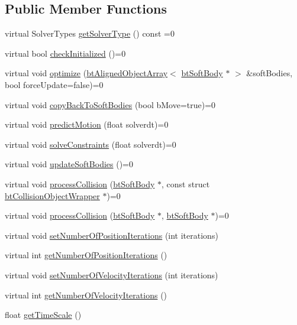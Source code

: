 \subsection*{Public Member Functions}
\begin{DoxyCompactItemize}
\item 
virtual Solver\+Types \hyperlink{classbt_soft_body_solver_aa08308ddb8e4661ab3c3e23cf3da647c}{get\+Solver\+Type} () const =0
\item 
virtual bool \hyperlink{classbt_soft_body_solver_aae0adf7ffc11cd7fafec927a54c654d5}{check\+Initialized} ()=0
\item 
virtual void \hyperlink{classbt_soft_body_solver_af07da1ec6f11e7873bc5fafef426fcd3}{optimize} (\hyperlink{classbt_aligned_object_array}{bt\+Aligned\+Object\+Array}$<$ \hyperlink{classbt_soft_body}{bt\+Soft\+Body} $\ast$ $>$ \&soft\+Bodies, bool force\+Update=false)=0
\item 
virtual void \hyperlink{classbt_soft_body_solver_ac4034ba178cb75bd880a44958eaa38d1}{copy\+Back\+To\+Soft\+Bodies} (bool b\+Move=true)=0
\item 
virtual void \hyperlink{classbt_soft_body_solver_a72f0c095ae30002a6f98fc194a63e1ba}{predict\+Motion} (float solverdt)=0
\item 
virtual void \hyperlink{classbt_soft_body_solver_a5e71a2a32786574bedf409ba822980eb}{solve\+Constraints} (float solverdt)=0
\item 
virtual void \hyperlink{classbt_soft_body_solver_adac4b4f20eee46dc4fab26ed25be89ef}{update\+Soft\+Bodies} ()=0
\item 
virtual void \hyperlink{classbt_soft_body_solver_a7dea7c2ce8ad4e8cae29219ffeebe18d}{process\+Collision} (\hyperlink{classbt_soft_body}{bt\+Soft\+Body} $\ast$, const struct \hyperlink{structbt_collision_object_wrapper}{bt\+Collision\+Object\+Wrapper} $\ast$)=0
\item 
virtual void \hyperlink{classbt_soft_body_solver_a08f03a574f0936d834ff100f87755ea6}{process\+Collision} (\hyperlink{classbt_soft_body}{bt\+Soft\+Body} $\ast$, \hyperlink{classbt_soft_body}{bt\+Soft\+Body} $\ast$)=0
\item 
virtual void \hyperlink{classbt_soft_body_solver_a80ffccfd244c51b2843991989a4191c9}{set\+Number\+Of\+Position\+Iterations} (int iterations)
\item 
virtual int \hyperlink{classbt_soft_body_solver_a814e9da6744f13f47613903e6fee5587}{get\+Number\+Of\+Position\+Iterations} ()
\item 
virtual void \hyperlink{classbt_soft_body_solver_a48b281048407640c73bfd355125a55e5}{set\+Number\+Of\+Velocity\+Iterations} (int iterations)
\item 
virtual int \hyperlink{classbt_soft_body_solver_a19a6754913540e92a387ffa5dbb2d29c}{get\+Number\+Of\+Velocity\+Iterations} ()
\item 
float \hyperlink{classbt_soft_body_solver_a6abd002edc15d4c80472fd4983679ea2}{get\+Time\+Scale} ()
\end{DoxyCompactItemize}
